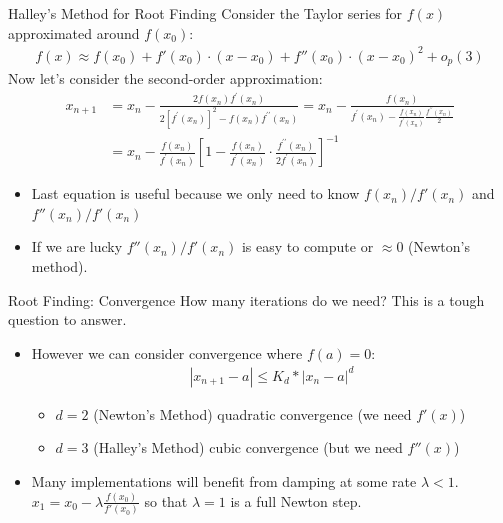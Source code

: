 \documentclass[aspectratio=169,11pt]{beamer}
\begin{document}
\begin{frame}{Halley's Method for Root Finding}
Consider the Taylor series for $f(x)$ approximated around $f(x_0)$:
\begin{align*}
f(x) \approx f(x_0) + f'(x_0) \cdot (x-x_0) + f''(x_0) \cdot (x-x_0)^2 + o_p(3)
\end{align*}
Now let's consider the second-order approximation:
\begin{align*}
x_{n+1}
&=x_{n}-\frac{2 f\left(x_{n}\right) f^{\prime}\left(x_{n}\right)}{2\left[f^{\prime}\left(x_{n}\right)\right]^{2}-f\left(x_{n}\right) f^{\prime \prime}\left(x_{n}\right)}
=x_{n}-\frac{f\left(x_{n}\right)}{f^{\prime}\left(x_{n}\right)-\frac{f\left(x_{n}\right)}{f^{\prime}\left(x_{n}\right)} \frac{f^{\prime \prime}\left(x_{n}\right)}{2}}\\
&=x_{n}-\frac{f\left(x_{n}\right)}{f^{\prime}\left(x_{n}\right)}\left[1-\frac{f\left(x_{n}\right)}{f^{\prime}\left(x_{n}\right)} \cdot \frac{f^{\prime \prime}\left(x_{n}\right)}{2 f^{\prime}\left(x_{n}\right)}\right]^{-1}
\end{align*}
\vspace{-.4cm}
\begin{itemize}
\item Last equation is useful because we only need to know $f(x_n)/f'(x_n)$ and $f''(x_n)/f'(x_n)$
\item If we are lucky $f''(x_n)/f'(x_n)$ is easy to compute or $\approx 0$ (Newton's method).
\end{itemize}
\end{frame}

\begin{frame}{Root Finding: Convergence}
How many iterations do we need? This is a tough question to answer.
\begin{itemize}
\item However we can consider convergence where $f(a) =0$:
\begin{align*}
\left|x_{n+1}-a\right| \leq K_d *\left|x_{n}-a\right|^{d}
\end{align*}
\begin{itemize}
\item $d=2$ (Newton's Method) \alert{quadratic convergence}  (we need $f'(x)$)
\item $d=3$ (Halley's Method) \alert{cubic convergence} (but we need $f''(x)$)
\end{itemize}
\item Many implementations will benefit from damping at some rate $\lambda <1$. $x_1 = x_0-\lambda \frac{f(x_0)}{f'(x_0)} $ so that $\lambda=1$ is a \alert{full Newton step}.
\end{itemize}
\end{frame}
\end{document}
